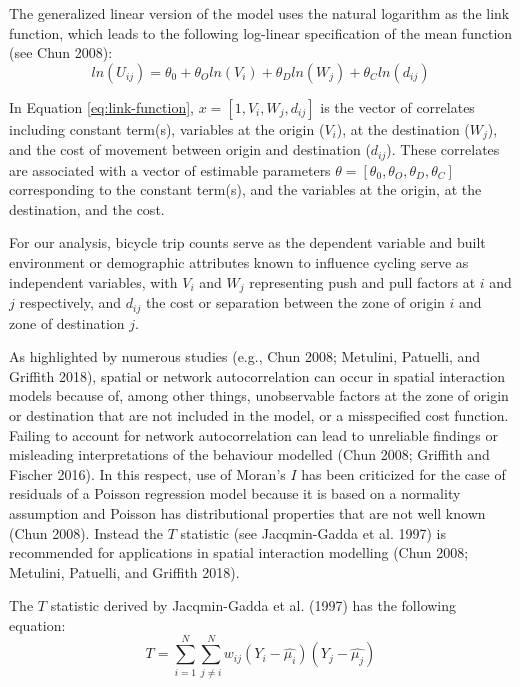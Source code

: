 \documentclass[smallextended]{svjour3}       %
\begin{document}
The generalized linear version of the model uses the natural logarithm
as the link function, which leads to the following log-linear
specification of the mean function (see Chun 2008): \begin{equation}
\label{eq:link-function}
ln(U_{ij}) = \theta_0 + \theta_O ln(V_i) + \theta_Dln(W_j) + \theta_C ln(d_{ij}) 
\end{equation}

In Equation \ref{eq:link-function}, \(x = [1, V_i, W_j, d_{ij}]\) is the
vector of correlates including constant term(s), variables at the origin
(\(V_i\)), at the destination (\(W_j\)), and the cost of movement
between origin and destination (\(d_{ij}\)). These correlates are
associated with a vector of estimable parameters
\(\theta = [\theta_0, \theta_O, \theta_D, \theta_C]\) corresponding to
the constant term(s), and the variables at the origin, at the
destination, and the cost.

For our analysis, bicycle trip counts serve as the dependent variable
and built environment or demographic attributes known to influence
cycling serve as independent variables, with \(V_i\) and \(W_j\)
representing push and pull factors at \(i\) and \(j\) respectively, and
\(d_{ij}\) the cost or separation between the zone of origin \(i\) and
zone of destination \(j\).

As highlighted by numerous studies (e.g., Chun 2008; Metulini, Patuelli,
and Griffith 2018), spatial or network autocorrelation can occur in
spatial interaction models because of, among other things, unobservable
factors at the zone of origin or destination that are not included in
the model, or a misspecified cost function. Failing to account for
network autocorrelation can lead to unreliable findings or misleading
interpretations of the behaviour modelled (Chun 2008; Griffith and
Fischer 2016). In this respect, use of Moran's \(I\) has been criticized
for the case of residuals of a Poisson regression model because it is
based on a normality assumption and Poisson has distributional
properties that are not well known (Chun 2008). Instead the \(T\)
statistic (see Jacqmin-Gadda et al. 1997) is recommended for
applications in spatial interaction modelling (Chun 2008; Metulini,
Patuelli, and Griffith 2018).

The \(T\) statistic derived by Jacqmin-Gadda et al. (1997) has the
following equation: \begin{equation}
\label{eq:T-statistic}
T = \sum_{i=1}^{N} \sum_{j\ne{i}}^{N} w_{ij}(Y_i - \hat{\mu_i})(Y_j - \hat{\mu_j})
\end{equation}
\end{document}
